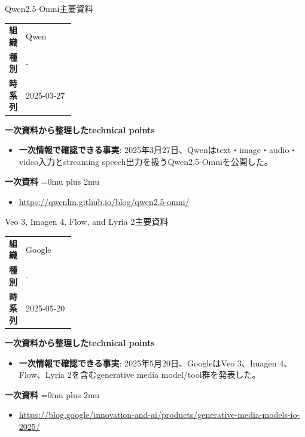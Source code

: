 \begin{technicalnote}{Qwen2.5-Omni}{主要資料}
\begingroup
\begin{tabularx}{\linewidth}{@{}>{\bfseries}p{0.22\linewidth}X@{}}
組織 & Qwen \\
種別 & - \\
時系列 & 2025-03-27 \\
\end{tabularx}
\smallskip
{\bfseries 一次資料から整理したtechnical points}
\begin{itemize}[leftmargin=1.5em,itemsep=0.35em]
\item \textbf{一次情報で確認できる事実}: 2025年3月27日、Qwenはtext・image・audio・video入力とstreaming speech出力を扱うQwen2.5-Omniを公開した。
\end{itemize}
\begin{samepage}
{\bfseries 一次資料}
\begingroup\sloppy
\Urlmuskip=0mu plus 2mu\relax
\begin{itemize}[leftmargin=1.5em,itemsep=0.25em]
\item {\scriptsize\url{https://qwenlm.github.io/blog/qwen2.5-omni/}}
\end{itemize}
\endgroup
\end{samepage}
\endgroup
\end{technicalnote}
\medskip

\begin{technicalnote}{Veo 3, Imagen 4, Flow, and Lyria 2}{主要資料}
\begingroup
\begin{tabularx}{\linewidth}{@{}>{\bfseries}p{0.22\linewidth}X@{}}
組織 & Google \\
種別 & - \\
時系列 & 2025-05-20 \\
\end{tabularx}
\smallskip
{\bfseries 一次資料から整理したtechnical points}
\begin{itemize}[leftmargin=1.5em,itemsep=0.35em]
\item \textbf{一次情報で確認できる事実}: 2025年5月20日、GoogleはVeo 3、Imagen 4、Flow、Lyria 2を含むgenerative media model/tool群を発表した。
\end{itemize}
\begin{samepage}
{\bfseries 一次資料}
\begingroup\sloppy
\Urlmuskip=0mu plus 2mu\relax
\begin{itemize}[leftmargin=1.5em,itemsep=0.25em]
\item {\scriptsize\url{https://blog.google/innovation-and-ai/products/generative-media-models-io-2025/}}
\end{itemize}
\endgroup
\end{samepage}
\endgroup
\end{technicalnote}
\medskip
